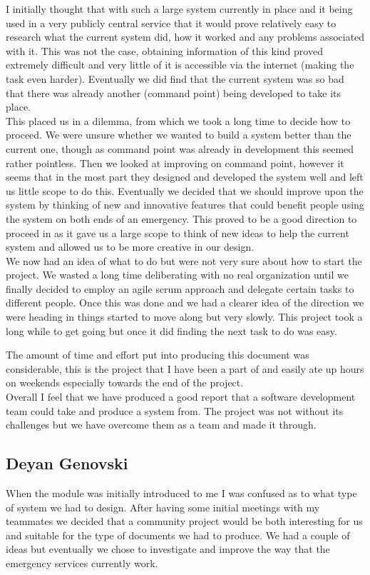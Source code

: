 \documentclass[]{article}
\begin{document}
I initially thought that with such a large system currently in place and it being used in a very publicly central service that it would prove relatively easy to research what the current system did, how it worked and any problems associated with it. This was not the case, obtaining information of this kind proved extremely difficult and very little of it is accessible via the internet (making the task even harder). Eventually we did find that the current system was so bad that there was already another (command point) being developed to take its place.\\

This placed us in a dilemma, from which we took a long time to decide how to proceed. We were unsure whether we wanted to build a system better than the current one, though as command point was already in development this seemed rather pointless. Then we looked at improving on command point, however it seems that in the most part they designed and developed the system well and left us little scope to do this. Eventually we decided that we should improve upon the system by thinking of new and innovative features that could benefit people using the system on both ends of an emergency. This proved to be a good direction to proceed in as it gave us a large scope to think of new ideas to help the current system and allowed us to be more creative in our design.\\

We now had an idea of what to do but were not very sure about how to start the project. We wasted a long time deliberating with no real organization until we finally decided to employ an agile scrum approach and delegate certain tasks to different people. Once this was done and we had a clearer idea of the direction we were heading in things started to move along but very slowly. This project took a long while to get going but once it did finding the next task to do was easy.\

The amount of time and effort put into producing this document was considerable, this is the project that I have been a part of and easily ate up hours on weekends especially towards the end of the project.\\

Overall I feel that we have produced a good report that a software development team could take and produce a system from. The project was not without its challenges but we have overcome them as a team and made it through.

    \pagebreak
    \subsection{Deyan Genovski}
    When the module was initially introduced to me I was confused as to what type of system we had to design. After having some initial meetings with my teammates we decided that a community project would be both interesting for us and suitable for the type of documents we had to produce. We had a couple of ideas but eventually we chose to investigate and improve the way that the emergency services currently work.\\
\end{document}
